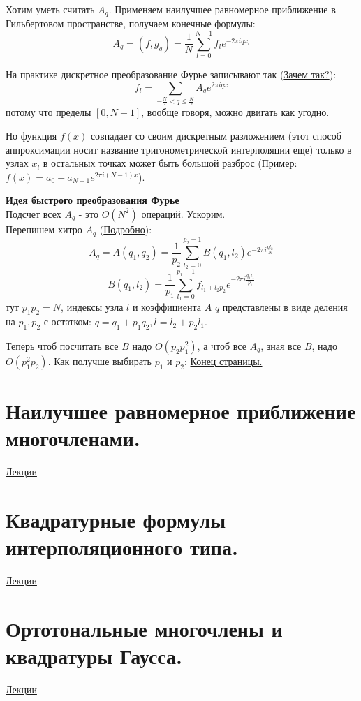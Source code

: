 \documentclass[specialist, subf, href, colorlinks=true, 12pt, times, mtpro, final]{disser}
\theoremstyle{definition}
\begin{document}
	Хотим уметь считать $A_q$. Применяем наилучшее равномерное приближение в Гильбертовом пространстве, получаем конечные формулы:
	$$
		A_q = (f, g_q) = \frac{1}{N}\sum\limits_{l = 0}^{N-1}f_le^{-2\pi i qx_l}
	$$
	
	На практике дискретное преобразование Фурье записывают так (\hyperlink {lects.33}{Зачем так?}):
	$$
		f_l = \sum\limits_{-\frac{N}{2} < q \le \frac{N}{2}} A_q e ^{2\pi i qx}
	$$
	потому что пределы $[0,N-1]$, вообще говоря, можно двигать как угодно.
	
	Но функция $f(x)$ совпадает со своим дискретным разложением (этот способ аппроксимации носит название тригонометрической интерполяции еще) только в узлах $x_l$ в остальных точках может быть большой разброс (\hyperlink {lects.33}{Пример:} $f(x) = a_0 + a_{N-1}e^{2\pi i (N-1)x}$).
	
	\textbf{Идея быстрого преобразования Фурье} \\
	Подсчет всех $A_q$ - это $O(N^2)$ операций. Ускорим.\\
	Перепишем хитро $A_q$ (\hyperlink {lects.34}{Подробно}):
	$$
		A_q = A(q_1, q_2) = \frac{1}{p_2}\sum\limits_{l_2 = 0}^{p_2 - 1} B(q_1, l_2)e^{-2\pi i \frac{ql_2}{N}}
	$$
	$$
		B(q_1, l_2) = \frac{1}{p_1}\sum\limits_{l_1 = 0}^{p_1 - 1}f_{l_1 + l_2p_2}e^{-2\pi i \frac{q_1l_1}{p_1}}
	$$
	тут $p_1p_2 = N$, индексы узла $l$ и коэффициента $A$ $q$ представлены в виде деления на $p_1, p_2$ с остатком: $q = q_1 + p_1q_2, l = l_2 + p_2l_1$.
	
	Теперь чтоб посчитать все $B$ надо $O(p_2p_1^2)$, а чтоб все $A_q$, зная все $B$, надо $O(p_1^2p_2)$. 
	Как получше выбирать $p_1$ и $p_2$: \hyperlink {lects.34}{Конец страницы.}

\section {Наилучшее равномерное приближение многочленами.}
	\hyperlink {lects.35}{Лекции}\\

\section {Квадратурные формулы интерполяционного типа.}
	\hyperlink {lects.37}{Лекции}\\

\section {Ортотональные многочлены и квадратуры Гаусса.}
	\hyperlink {lects.40}{Лекции}\\
\end{document}
